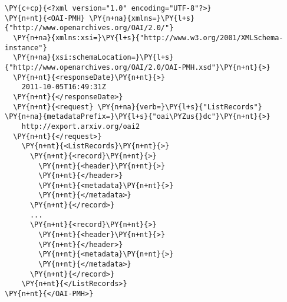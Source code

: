 \begin{Verbatim}[commandchars=\\\{\}, fontsize=\footnotesize, frame=single]
\PY{c+cp}{<?xml version="1.0" encoding="UTF-8"?>}
\PY{n+nt}{<OAI-PMH} \PY{n+na}{xmlns=}\PY{l+s}{"http://www.openarchives.org/OAI/2.0/"}
  \PY{n+na}{xmlns:xsi=}\PY{l+s}{"http://www.w3.org/2001/XMLSchema-instance"} 
  \PY{n+na}{xsi:schemaLocation=}\PY{l+s}{"http://www.openarchives.org/OAI/2.0/OAI-PMH.xsd"}\PY{n+nt}{>}
  \PY{n+nt}{<responseDate}\PY{n+nt}{>}
    2011-10-05T16:49:31Z
  \PY{n+nt}{</responseDate>}
  \PY{n+nt}{<request} \PY{n+na}{verb=}\PY{l+s}{"ListRecords"} \PY{n+na}{metadataPrefix=}\PY{l+s}{"oai\PYZus{}dc"}\PY{n+nt}{>}
    http://export.arxiv.org/oai2
  \PY{n+nt}{</request>}
    \PY{n+nt}{<ListRecords}\PY{n+nt}{>}
      \PY{n+nt}{<record}\PY{n+nt}{>}
        \PY{n+nt}{<header}\PY{n+nt}{>}
        \PY{n+nt}{</header>}
        \PY{n+nt}{<metadata}\PY{n+nt}{>}
        \PY{n+nt}{</metadata>}
      \PY{n+nt}{</record>}
      ...
      \PY{n+nt}{<record}\PY{n+nt}{>}
        \PY{n+nt}{<header}\PY{n+nt}{>}
        \PY{n+nt}{</header>}
        \PY{n+nt}{<metadata}\PY{n+nt}{>}
        \PY{n+nt}{</metadata>}
      \PY{n+nt}{</record>}
    \PY{n+nt}{</ListRecords>}
\PY{n+nt}{</OAI-PMH>}
\end{Verbatim}
